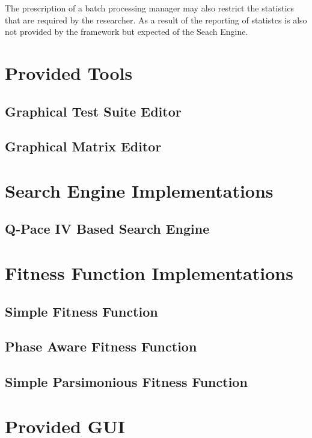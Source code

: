 The prescription of a batch processing manager may also restrict the statistics that are required by the researcher.
As a result of the reporting of statistcs is also not provided by the framework but expected of the Seach Engine.

\section{Provided Tools}
\subsection{Graphical Test Suite Editor}
\label{sec:indtestsuiteeditor}

\subsection{Graphical Matrix Editor}
\label{sec:indmatrixeditor}

\section{Search Engine Implementations}
\subsection{Q-Pace IV Based Search Engine}

\section{Fitness Function Implementations}
\subsection{Simple Fitness Function}

\subsection{Phase Aware Fitness Function}

\subsection{Simple Parsimonious Fitness Function}

\section{Provided GUI}

